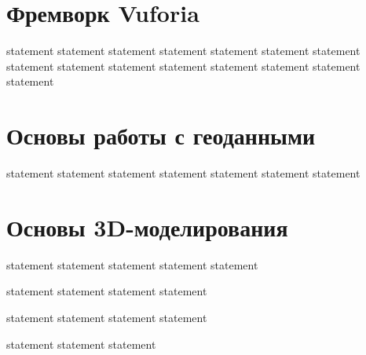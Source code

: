 \section{Фремворк Vuforia}

{statement}
{statement}
{statement}
{statement}
{statement}
{statement}
{statement}
{statement}
{statement}
{statement}
{statement}
{statement}
{statement}
{statement}
{statement}

\section{Основы работы с геоданными}

{statement}
{statement}
{statement}
{statement}
{statement}
{statement}
{statement}

\section{Основы 3D-моделирования}

{statement}
{statement}
{statement}
{statement}
{statement}

{statement}
{statement}
{statement}
{statement}

{statement}
{statement}
{statement}
{statement}

{statement}
{statement}
{statement}

